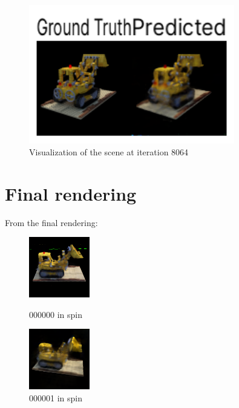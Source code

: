 \documentclass[12pt]{article}
\begin{document}
\begin{figure}[H]
    \centering
    \includegraphics[width=0.8\textwidth]{outputs/progress/008064.png}
    \caption{Visualization of the scene at iteration 8064}
\end{figure}


\section{Final rendering}
From the final rendering: 
\begin{figure}[H]
    \centering
    \begin{minipage}[b]{0.45\linewidth}
        \centering
        \includegraphics[scale=0.8]{outputs/spin/000000.png}
        \caption{000000 in spin}
        \label{fig:spin000000}
    \end{minipage}\hfill
    \begin{minipage}[b]{0.45\linewidth}
        \centering
        \includegraphics[scale=0.8]{expected_results/000001.png}
        \caption{000001 in spin}
        \label{fig:spin000001}
    \end{minipage}
  \end{figure}
\end{document}
